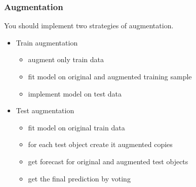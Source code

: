 \documentclass{beamer}
\begin{document}
	\begin{frame}
		\frametitle{Augmentation}
		
		You should implement two strategies of augmentation.
		
	\begin{itemize}
		\item Train augmentation
		
		\begin{itemize}
			\item augment only train data
			\item fit model on original and augmented training sample
			\item implement model on test data
		\end{itemize}
	
		\item Test augmentation
		
		\begin{itemize}
			\item fit model on original train data
			\item for each test object create it augmented copies
			\item get forecast for original and augmented test objects
			\item get the final prediction by voting
		\end{itemize}
	\end{itemize}
	\end{frame}
	
	
		
\end{document}
